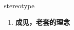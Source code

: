 
\begin{frame}
{\huge stereotype}
\begin{center}
\begin{enumerate}\Large
  \item \textbf{成见，老套的理念}
\end{enumerate}
\end{center}
\end{frame}

